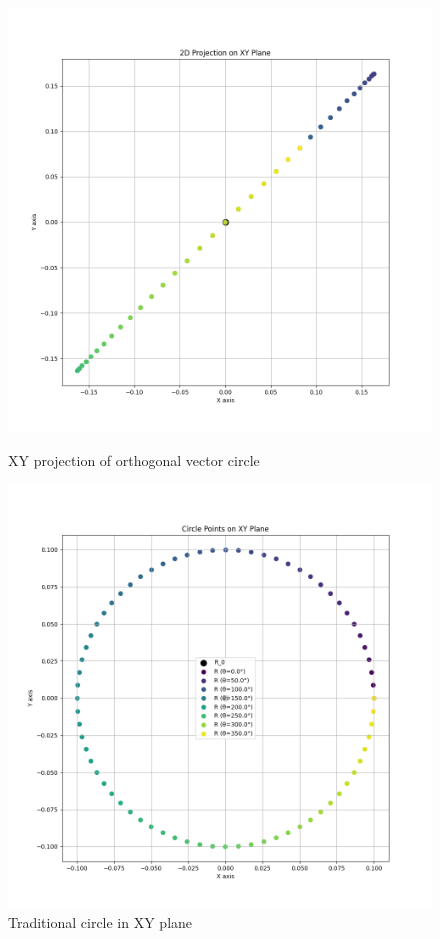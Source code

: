 \begin{figure}[H]
    \centering
    \begin{minipage}{0.48\textwidth}
        \centering
        \includegraphics[width=\textwidth]{figures/circle_xy.png}
        \caption{XY projection of orthogonal vector circle}
        \label{fig:vis_circle_xy}
    \end{minipage}\hfill
    \begin{minipage}{0.48\textwidth}
        \centering
        \includegraphics[width=\textwidth]{figures/xy_circle.png}
        \caption{Traditional circle in XY plane}
        \label{fig:vis_xy_circle}
    \end{minipage}
\end{figure}

